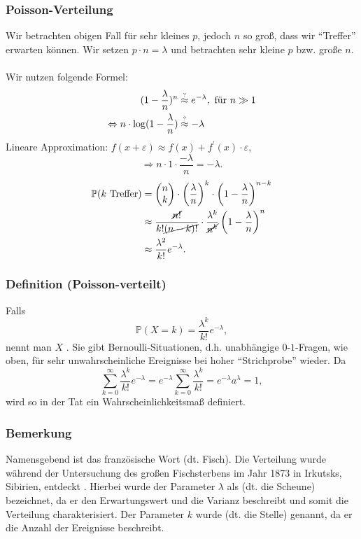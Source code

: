 \subsubsection{Poisson-Verteilung}
Wir betrachten obigen Fall f\"ur sehr kleines $p$, jedoch $n$ so gro\ss{}, dass wir ``Treffer'' erwarten k\"onnen. Wir setzen $p\cdot n=\lambda$ und betrachten sehr kleine $p$ bzw. gro\ss{}e $n$.
\\~\\
Wir nutzen folgende Formel:
\begin{align*}
(1-\frac{\lambda}{n})^n&\textabove{?}{\approx} e^{-\lambda},\ \text{f\"ur }n\gg1\\
\Leftrightarrow n\cdot\log(1-\frac{\lambda}{n})&\textabove{?}{\approx}-\lambda\\
\end{align*}
Lineare Approximation: $f(x+\varepsilon)\approx f(x)+f^\prime(x)\cdot\varepsilon$,
\[
\Rightarrow n\cdot1\cdot\frac{-\lambda}{n}=-\lambda.
\]
\begin{align*}
\mathbb{P}(k\text{ Treffer})&=\begin{pmatrix}n\\k\end{pmatrix}\cdot\left(\frac{\lambda}{n}\right)^k\cdot\left(1-\frac{\lambda}{n}\right)^{n-k}\\
&\approx\frac{\cancel{n!}}{k!\cancel{(n-k)!}}\cdot\frac{\lambda^k}{\cancel{n^k}}\left(1-\frac{\lambda}{n}\right)^n\\
&\approx\frac{\lambda^2}{k!}e^{-\lambda}.
\end{align*}
\subsubsection{Definition (Poisson-verteilt)}
Falls
\[\mathbb{P}(X=k)=\frac{\lambda^k}{k!}e^{-\lambda},\]
nennt man $X$ . Sie gibt Bernoulli-Situationen, d.h. unabh\"angige $0$-$1$-Fragen, wie oben, f\"ur sehr unwahrscheinliche Ereignisse bei hoher ``Strichprobe'' wieder. Da
\[
\sum_{k=0}^\infty\frac{\lambda^k}{k!}e^{-\lambda}=e^{-\lambda}\sum_{k=0}^\infty\frac{\lambda^k}{k!}=e^{-\lambda}a^{\lambda}=1,
\]
wird so in der Tat ein Wahrscheinlichkeitsma\ss{} definiert.
\subsubsection{Bemerkung}
Namensgebend ist das franz\"osische Wort  (dt. Fisch). Die Verteilung wurde w\"ahrend der Untersuchung des gro\ss{}en Fischsterbens im Jahr 1873 in Irkutsks, Sibirien, entdeckt \cite{Pickl15}. Hierbei wurde der Parameter $\lambda$ als  (dt. die Scheune) bezeichnet, da er den Erwartungswert und die Varianz beschreibt und somit die Verteilung charakterisiert. Der Parameter $k$ wurde  (dt. die Stelle) genannt, da er die Anzahl der Ereignisse beschreibt.

